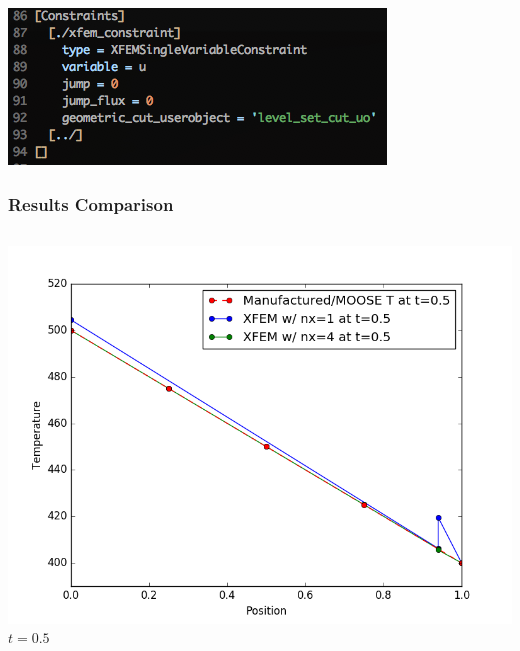 \documentclass[]{beamer}
\begin{document}
\begin{frame}
\begin{columns}
\begin{center}
			\end{center}
	\end{columns}
	\begin{center}
	\includegraphics[scale=0.4]{figures/Screen-Constraints-1Dxyh1m}
	\end{center}
\end{frame}

\begin{frame}[t]\frametitle{Results Comparison}
  	\begin{columns}
			\begin{center}
			\includegraphics[scale=0.17]{figures/1D_xy_homog1mat_u_vs_x_05}\\
			$t=0.5$
			
			\null
			

\end{center}
\end{columns}
\end{frame}
\end{document}
